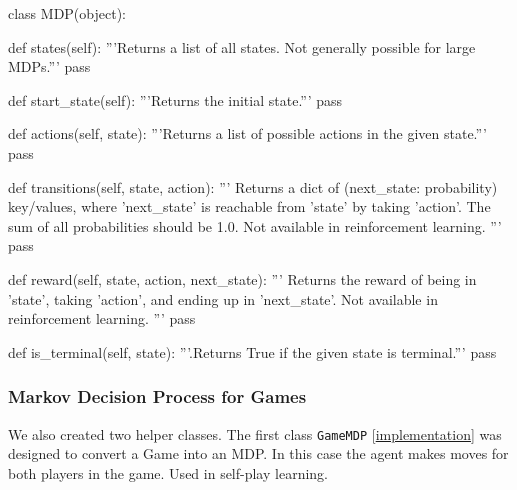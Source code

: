 \documentclass{article}
\newcommand{\GithubURL}[1]{[\href{https://github.com/davidrobles/mlnd-capstone-code/blob/master/#1}{implementation}]}
\begin{document}
\begin{python}
class MDP(object):

    def states(self):
        '''Returns a list of all states. Not generally possible for large MDPs.'''
        pass

    def start_state(self):
        '''Returns the initial state.'''
        pass

    def actions(self, state):
        '''Returns a list of possible actions in the given state.'''
        pass

    def transitions(self, state, action):
        '''
        Returns a dict of (next_state: probability) key/values, where 'next_state' is
        reachable from 'state' by taking 'action'. The sum of all probabilities should
        be 1.0. Not available in reinforcement learning.
        '''
        pass

    def reward(self, state, action, next_state):
        '''
        Returns the reward of being in 'state', taking 'action', and ending up
        in 'next_state'. Not available in reinforcement learning.
        '''
        pass

    def is_terminal(self, state):
        '''.Returns True if the given state is terminal.'''
        pass
\end{python}

\subsubsection{Markov Decision Process for Games}

We also created two helper classes. The first class \texttt{GameMDP}
\GithubURL{capstone/rl/mdp.py\#L66} was designed to convert a Game into an MDP. In this case the
agent makes moves for both players in the game. Used in self-play learning.
\end{document}
